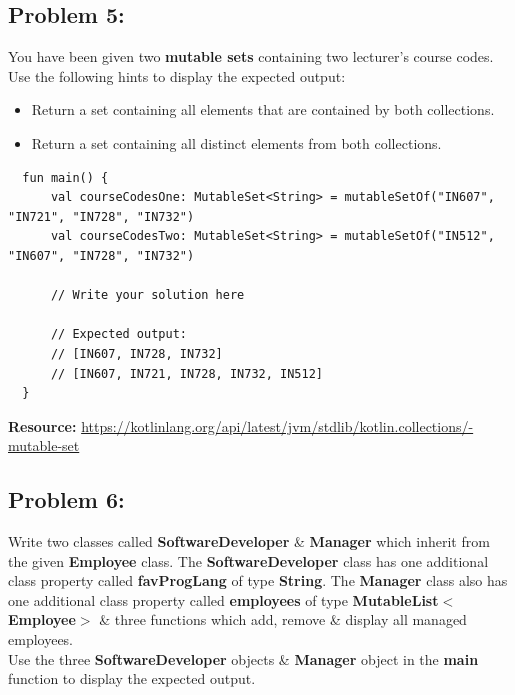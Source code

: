 \documentclass{article}
\begin{document}
\subsection*{Problem 5:} You have been given two \textbf{mutable sets} containing two lecturer's course codes. Use the following hints to display the expected output:
\begin{itemize}
  \item Return a set containing all elements that are contained by both collections. 
  \item Return a set containing all distinct elements from both collections.
\end{itemize}

\begin{verbatim}
  fun main() {
      val courseCodesOne: MutableSet<String> = mutableSetOf("IN607", "IN721", "IN728", "IN732")
      val courseCodesTwo: MutableSet<String> = mutableSetOf("IN512", "IN607", "IN728", "IN732")

      // Write your solution here

      // Expected output:
      // [IN607, IN728, IN732]
      // [IN607, IN721, IN728, IN732, IN512] 
  }
\end{verbatim}

\textbf{Resource:} \href{https://kotlinlang.org/api/latest/jvm/stdlib/kotlin.collections/-mutable-set}{https://kotlinlang.org/api/latest/jvm/stdlib/kotlin.collections/-mutable-set}

\subsection*{Problem 6:} 
Write two classes called \textbf{SoftwareDeveloper} \& \textbf{Manager} which inherit from the given \textbf{Employee} class. The \textbf{SoftwareDeveloper} class has one additional class property called \textbf{favProgLang} of type \textbf{String}. The \textbf{Manager} class also has one additional class property called \textbf{employees} of type \textbf{MutableList$<$Employee$>$} \& three functions which add, remove \& display all managed employees. \\

Use the three \textbf{SoftwareDeveloper} objects \& \textbf{Manager} object in the \textbf{main} function to display the expected output.
\end{document}
